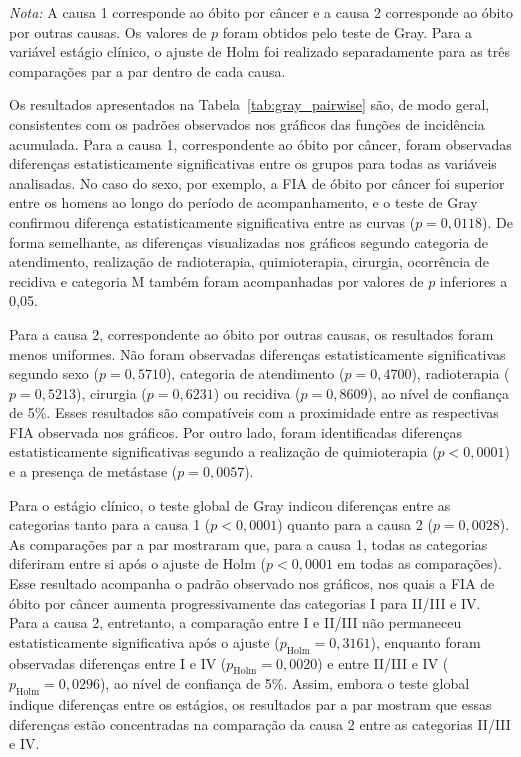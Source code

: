 \documentclass[11pt,a4paper]{article}
\begin{document}
\begin{table}[H]
{\begin{tabular}{llrrrr}
\bottomrule
\end{tabular}
}
\vspace{0.2cm}

\begin{minipage}{0.95\textwidth}
\footnotesize
\textit{Nota:} A causa 1 corresponde ao óbito por câncer e a causa 2 corresponde ao óbito por outras causas. Os valores de $p$ foram obtidos pelo teste de Gray. Para a variável estágio clínico, o ajuste de Holm foi realizado separadamente para as três comparações par a par dentro de cada causa. 
\end{minipage}

\end{table}

Os resultados apresentados na Tabela~\ref{tab:gray_pairwise} são, de modo geral, consistentes com os padrões observados nos gráficos das funções de incidência acumulada. Para a causa 1, correspondente ao óbito por câncer, foram observadas diferenças estatisticamente significativas entre os grupos para todas as variáveis analisadas. No caso do sexo, por exemplo, a FIA de óbito por câncer foi superior entre os homens ao longo do período de acompanhamento, e o teste de Gray confirmou diferença estatisticamente significativa entre as curvas ($p=0,0118$). De forma semelhante, as diferenças visualizadas nos gráficos segundo categoria de atendimento, realização de radioterapia, quimioterapia, cirurgia, ocorrência de recidiva e categoria M também foram acompanhadas por valores de $p$ inferiores a 0,05.

Para a causa 2, correspondente ao óbito por outras causas, os resultados foram menos uniformes. Não foram observadas diferenças estatisticamente significativas segundo sexo ($p=0,5710$), categoria de atendimento ($p=0,4700$), radioterapia ($p=0,5213$), cirurgia ($p=0,6231$) ou recidiva ($p=0,8609$), ao nível de confiança de 5\%. Esses resultados são compatíveis com a proximidade entre as respectivas FIA observada nos gráficos. Por outro lado, foram identificadas diferenças estatisticamente significativas segundo a realização de quimioterapia ($p<0,0001$) e a presença de metástase ($p=0,0057$).

Para o estágio clínico, o teste global de Gray indicou diferenças entre as categorias tanto para a causa 1 ($p<0,0001$) quanto para a causa 2 ($p=0,0028$). As comparações par a par mostraram que, para a causa 1, todas as categorias diferiram entre si após o ajuste de Holm ($p<0,0001$ em todas as comparações). Esse resultado acompanha o padrão observado nos gráficos, nos quais a FIA de óbito por câncer aumenta progressivamente das categorias I para II/III e IV. Para a causa 2, entretanto, a comparação entre I e II/III não permaneceu estatisticamente significativa após o ajuste ($p_{\mathrm{Holm}}=0,3161$), enquanto foram observadas diferenças entre I e IV ($p_{\mathrm{Holm}}=0,0020$) e entre II/III e IV ($p_{\mathrm{Holm}}=0,0296$), ao nível de confiança de 5\%. Assim, embora o teste global indique diferenças entre os estágios, os resultados par a par mostram que essas diferenças estão concentradas na comparação da causa 2 entre as categorias II/III e IV.
\end{document}
